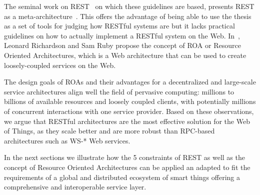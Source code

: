 The seminal work on REST~\cite{Fielding2000} on which these guidelines are based, presents REST as a meta-architecture~\cite{Richardson2007}. This offers the advantage of being able to use the thesis as a set of tools for judging how RESTful systems are but it lacks practical guidelines on how to actually implement a RESTful system on the Web. In~\cite{Richardson2007}, Leonard Richardson and Sam Ruby propose the concept of ROA or Resource Oriented Architectures, which is a Web architecture that can be used to create loosely-coupled services on the Web.

The design goals of ROAs and their advantages for a decentralized and large-scale service architectures align well the field of pervasive computing: millions to billions of available resources and loosely coupled clients, with potentially millions of concurrent interactions with one service provider. Based on these observations, we argue that RESTful architectures are the most effective solution for the Web of Things, as they scale better and are more robust than RPC-based architectures such as WS-* Web services.

In the next sections we illustrate how the 5 constraints of REST as well as the concept of Resource Oriented Architectures can be applied an adapted to fit the requirements of a global and distributed ecosystem of smart things offering a comprehensive and interoperable service layer.

